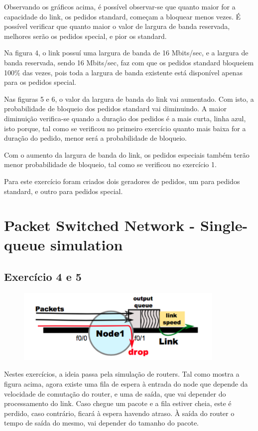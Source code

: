 \documentclass[pdftex,12pt,a4paper]{report}
\begin{document}
Observando os gráficos acima, é possível observar-se que quanto maior for a capacidade do link, os pedidos standard, começam a bloquear menos vezes. É possível verificar que quanto maior o valor de largura de banda reservada, melhores serão os pedidos special, e pior os standard. 

Na figura 4, o link possuí uma largura de banda de 16 Mbits/sec, e a largura de banda reservada, sendo 16 Mbits/sec, faz com que os pedidos standard bloqueiem 100\% das vezes, pois toda a largura de banda existente está disponível apenas para os pedidos special.

Nas figuras 5 e 6, o valor da largura de banda do link vai aumentado. Com isto, a probabilidade de bloqueio dos pedidos standard vai diminuindo. A maior diminuição verifica-se quando a duração dos pedidos é a mais curta, linha azul, isto porque, tal como se verificou no primeiro exercício quanto mais baixa for a duração do pedido, menor será a probabilidade de bloqueio.

Com o aumento da largura de banda do link, os pedidos especiais também terão menor probabilidade de bloqueio, tal como se verificou no exercício 1.

Para este exercício foram criados dois geradores de pedidos, um para pedidos standard, e outro para pedidos special.

\newpage
\section{Packet Switched Network - Single-queue simulation}
\subsection{Exercício 4 e 5}

\begin{figure}[!htb]
\center
 \includegraphics[width=100mm,scale=1]{imagensGuia/ex4.png}
 \label{fig:ex4}
\end{figure}

Nestes exercícios, a ideia passa pela simulação de routers. Tal como mostra a figura acima, agora existe uma fila de espera à entrada do node que depende da velocidade de comutação do router, e uma de saída, que vai depender do processamento do link.
Caso chegue um pacote e a fila estiver cheia, este é perdido, caso contrário, ficará à espera havendo atraso.
À saída do router o tempo de saída do mesmo, vai depender do tamanho do pacote.
\end{document}
